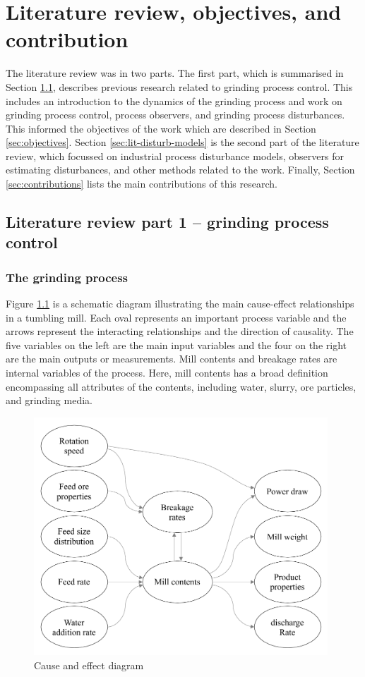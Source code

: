 \chapter{Literature review, objectives, and contribution}
\label{chap-lit-review}

The literature review was in two parts. The first part, which is summarised in Section \ref{sec:lit-grinding}, describes previous research related to grinding process control. This includes an introduction to the dynamics of the grinding process and work on grinding process control, process observers, and grinding process disturbances. This informed the objectives of the work which are described in Section \ref{sec:objectives}. Section \ref{sec:lit-disturb-models} is the second part of the literature review, which focussed on industrial process disturbance models, observers for estimating disturbances, and other methods related to the work. Finally, Section \ref{sec:contributions} lists the main contributions of this research.

\section{Literature review part 1 – grinding process control} \label{sec:lit-grinding}

\subsection{The grinding process}

Figure \ref{fig:cause-effect} is a schematic diagram illustrating the main cause-effect relationships in a tumbling mill. Each oval represents an important process variable and the arrows represent the interacting relationships and the direction of causality. The five variables on the left are the main input variables and the four on the right are the main outputs or measurements. Mill contents and breakage rates are internal variables of the process. Here, mill contents has a broad definition encompassing all attributes of the contents, including water, slurry, ore particles, and grinding media.
\begin{figure}[htp]
	\centering
	\includegraphics[width=11cm]{images/cause-effect.pdf}
	\caption{Cause and effect diagram} \label{fig:cause-effect}
\end{figure}

